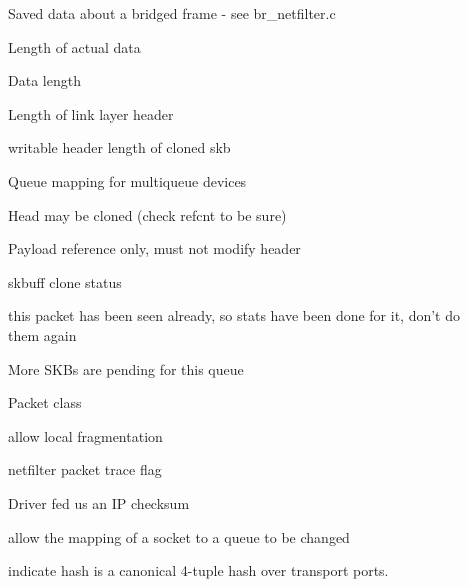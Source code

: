 \documentclass[a4paper,8pt,english]{sphinxmanual}
\begin{document}
\begin{description}
\item[{}] \leavevmode
Saved data about a bridged frame - see br\_netfilter.c

\item[{}] \leavevmode
Length of actual data

\item[{}] \leavevmode
Data length

\item[{}] \leavevmode
Length of link layer header

\item[{}] \leavevmode
writable header length of cloned skb

\item[{}] \leavevmode
Queue mapping for multiqueue devices

\item[{}] \leavevmode
Head may be cloned (check refcnt to be sure)

\item[{}] \leavevmode
Payload reference only, must not modify header

\item[{}] \leavevmode
skbuff clone status

\item[{}] \leavevmode
this packet has been seen already, so stats have been
done for it, don't do them again

\item[{}] \leavevmode
More SKBs are pending for this queue

\item[{}] \leavevmode
Packet class

\item[{}] \leavevmode
allow local fragmentation

\item[{}] \leavevmode
netfilter packet trace flag

\item[{}] \leavevmode
Driver fed us an IP checksum

\item[{}] \leavevmode
allow the mapping of a socket to a queue to be changed

\item[{}] \leavevmode
indicate hash is a canonical 4-tuple hash over transport
ports.


\end{description}
\end{document}
